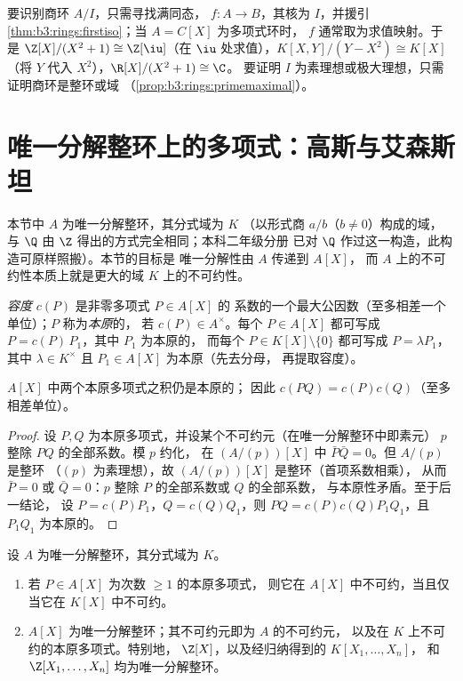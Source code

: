 \begin{method}\label{met:b3:rings:quotient}
要识别商环 $A/I$，只需寻找满同态，
$f \colon A \to B$，其核为 $I$，并援引
\cref{thm:b3:rings:firstiso}；当 $A = C[X]$ 为多项式环时，
$f$ 通常取为求值映射。于是 $\Z[X]/(X^2+1) \cong
\Z[\iu]$（在 $\iu$ 处求值），$K[X,Y]/(Y - X^2) \cong K[X]$
（将 $Y$ 代入 $X^2$），$\R[X]/(X^2+1) \cong \C$。
要证明 $I$ 为素理想或极大理想，只需证明商环是整环或域
（\cref{prop:b3:rings:primemaximal}）。
\end{method}

\section{唯一分解整环上的多项式：高斯与艾森斯坦}

本节中 $A$ 为唯一分解整环，其分式域为 $K$
（以形式商 $a/b$（$b \neq 0$）构成的域，
与 $\Q$ 由 $\Z$ 得出的方式完全相同；本科二年级分册
已对 $\Q$ 作过这一构造，此构造可原样照搬）。本节的目标是
唯一分解性由 $A$ 传递到 $A[X]$，
而 $A$ 上的不可约性本质上就是更大的域 $K$ 上的不可约性。

\begin{definition}\label{def:b3:rings:content}
\emph{容度} $c(P)$ 是非零多项式 $P \in A[X]$ 的
系数的一个最大公因数（至多相差一个单位）；$P$ 称为\emph{本原}的，
若 $c(P) \in A^\times$。每个 $P
\in A[X]$ 都可写成 $P = c(P)\,P_1$，其中 $P_1$ 为本原的，
而每个 $P \in K[X]\setminus\{0\}$ 都可写成 $P = \lambda P_1$，其中 $\lambda
\in K^\times$ 且 $P_1 \in A[X]$ 为本原（先去分母，
再提取容度）。
\end{definition}

\begin{lemma}[高斯]\label{lem:b3:rings:gauss}
$A[X]$ 中两个本原多项式之积仍是本原的；
因此 $c(PQ) = c(P)c(Q)$（至多相差单位）。
\end{lemma}

\begin{proof}
设 $P, Q$ 为本原多项式，并设某个不可约元（在唯一分解整环中即素元）
$p$ 整除 $PQ$ 的全部系数。模 $p$ 约化，
在 $(A/(p))[X]$ 中 $\bar P \bar Q = 0$。但 $A/(p)$ 是整环
（$(p)$ 为素理想），故 $(A/(p))[X]$ 是整环（首项系数相乘），
从而 $\bar P = 0$ 或 $\bar Q = 0$：$p$ 整除 $P$ 的全部系数或 $Q$ 的全部系数，
与本原性矛盾。至于后一结论，
设 $P = c(P)P_1$，$Q = c(Q)Q_1$，则 $PQ =
c(P)c(Q) P_1Q_1$，且 $P_1Q_1$ 为本原的。
\end{proof}

\begin{theorem}\label{thm:b3:rings:gaussufd}
设 $A$ 为唯一分解整环，其分式域为 $K$。
\begin{enumerate}
  \item 若 $P \in A[X]$ 为次数 $\geq 1$ 的本原多项式，
        则它在 $A[X]$ 中不可约，当且仅当它在 $K[X]$ 中不可约。
  \item $A[X]$ 为唯一分解整环；其不可约元即为 $A$ 的不可约元，
        以及在 $K$ 上不可约的本原多项式。特别地，
        $\Z[X]$，以及经归纳得到的 $K[X_1, \dots, X_n]$，
        和 $\Z[X_1, \dots, X_n]$ 均为唯一分解整环。
\end{enumerate}
\end{theorem}

